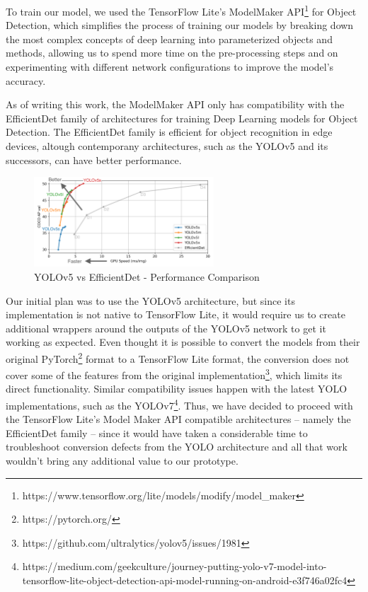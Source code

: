 \documentclass[openright]{normas-utf-tex} %
\begin{document}
To train our model, we used the TensorFlow Lite's ModelMaker API\footnote{https://www.tensorflow.org/lite/models/modify/model\_maker} 
for Object Detection, which simplifies the process of training our models by breaking down the most
complex concepts of deep learning into parameterized objects and methods, allowing us to spend
more time on the pre-processing steps and on experimenting with different network configurations
to improve the model's accuracy. 

As of writing this work, the ModelMaker API only has compatibility
with the EfficientDet family of architectures \cite{Mingxing2020} for training
Deep Learning models for Object Detection. The EfficientDet family is efficient
for object recognition in edge devices, altough contemporany architectures,
such as the YOLOv5 and its successors, can have better performance.

\begin{figure}[H]
	\centering
	\includegraphics[width=0.6\textwidth]{./images/yolo-efficientdet-comparison.png}
	\caption[YOLOv5 vs EfficientDet - Performance Comparison]{YOLOv5 vs EfficientDet - Performance Comparison}
    \label{fig:diff}
\end{figure}

Our initial plan was to use the YOLOv5 architecture, but since its
implementation is not native to TensorFlow Lite, it would require us to create
additional wrappers around the outputs of the YOLOv5 network to get it working
as expected. Even thought it is possible to convert the models from their
original PyTorch\footnote{https://pytorch.org/} format to a TensorFlow Lite
format, the conversion does not cover some of the features from the original
implementation\footnote{https://github.com/ultralytics/yolov5/issues/1981},
which limits its direct functionality. Similar compatibility issues happen with
the latest YOLO implementations, such as the
YOLOv7\footnote{https://medium.com/geekculture/journey-putting-yolo-v7-model-into-tensorflow-lite-object-detection-api-model-running-on-android-e3f746a02fc4}.
Thus, we have decided to proceed with the TensorFlow Lite's Model Maker API
compatible architectures -- namely the EfficientDet family --  since it would
have taken a considerable time to troubleshoot conversion defects from the YOLO
architecture and all that work wouldn't bring any additional value to our
prototype.
\end{document}
